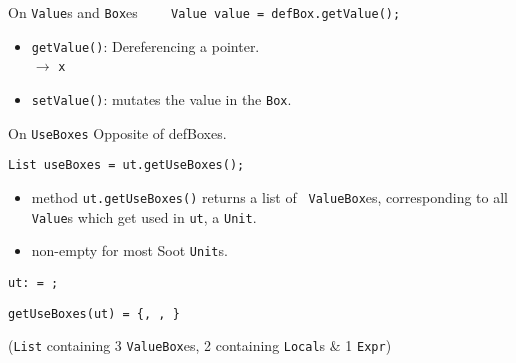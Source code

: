 \begin{slide}{On {\tt Value}s and {\tt Box}es}
{\red \verb+    Value value = defBox.getValue();+}

\begin{itemize}
\item {\tt getValue()}: Dereferencing a pointer.\\
\qquad \qquad \qquad \qquad {} $\to$ {\tt x}
\item {\tt setValue()}: mutates the value in the {\tt Box}.
\end{itemize}

\end{slide}

\begin{slide}{On {\tt UseBoxes}}
\vspace*{-0.1in}
Opposite of defBoxes.

{\tt List useBoxes = ut.getUseBoxes();}

\vspace*{-0.05in}
\begin{itemize}
\item method {\red \tt ut.getUseBoxes()} returns a list of {\tt
ValueBox}es, corresponding to all {\tt Value}s which get used
in {\tt ut}, a {\tt Unit}. 

\item non-empty for most Soot {\tt Unit}s.
\end{itemize}

\vspace*{-0.08in}
\begin{center}
{\tt ut: {\red {}} = {\blue {}};}
\end{center}

\vspace*{0.05in}
{\tt getUseBoxes(ut) = \{{\blue {}}, {\blue {}}, {\blue {}}\}}\\
\qquad \qquad \begin{minipage}{0.8\textwidth} 
({\tt List} containing 3 {\tt ValueBox}es, 2 containing {\tt Local}s \& 1
{\tt Expr})
\end{minipage}

\end{slide}

